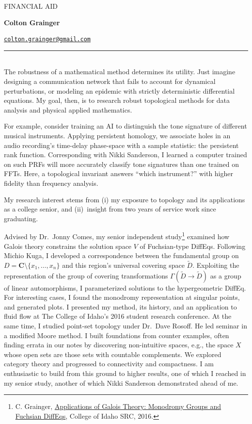 \documentclass{article}
\makeatletter
\newcommand\textbox[1]{\parbox{.33\textwidth}{#1}}
\newcommand\printheader{\noindent
  \textbox{FINANCIAL AID}
  \textbox{\centerline{\large\bf Colton Grainger}}
  \textbox{\raggedleft \href{mailto:colton.grainger@gmail.com}{\texttt{colton.grainger@gmail.com}}\ }

  \vspace{-15pt}
  \noindent
  \rule{\textwidth}{1pt}\\
}
\makeatother
\begin{document}
 

\printheader

The robustness of a mathematical method determines its utility. Just
imagine designing a communication network that fails to account for
dynamical perturbations, or modeling an epidemic with strictly
deterministic differential equations. My goal, then, is to research
robust topological methods for data analysis and physical applied
mathematics.

For example, consider training an AI to distinguish the tone signature
of different musical instruments. Applying persistent homology, we
associate holes in an audio recording's time-delay phase-space with a
sample statistic: the persistent rank function. Corresponding with Nikki
Sanderson, I learned a computer trained on such PRFs will more
accurately classify tone signatures than one trained on FFTs. Here, a
topological invariant answers ``which instrument?'' with higher fidelity
than frequency analysis.

My research interest stems from (i) my exposure to topology and its
applications as a college senior, and (ii)~insight from two years of
service work since graduating.

Advised by Dr.~Jonny Comes, my senior independent study\footnote{C.
  Grainger,
  \href{http://coltongrainger.com/documents/cgrainger_coursework_galois_poster.pdf}{Applications
  of Galois Theory: Monodromy Groups and Fuchsian DiffEqs}, College of Idaho SRC, 2016.}
examined how Galois theory constrains the solution space \(V\) of
Fuchsian-type DiffEqs. Following Michio Kuga, I developed a
correspondence between the fundamental group on
\(D = \mathbf{C}\setminus\{x_1,\ldots,x_n\}\) and this region's
universal covering space \(\tilde{D}\). Exploiting the representation of
the group of covering transformations
\(\Gamma(\tilde{D} \to \tilde{D})\) as a group of linear automorphisms,
I parameterized solutions to the hypergeometric DiffEq. For
interesting cases, I found the monodromy representation at singular
points, and generated plots. I presented my method, its history, and an
application to fluid flow at The College of Idaho's 2016 student
research conference. At the same time, I studied point-set topology
under Dr.~Dave Rosoff. He led seminar in a modified Moore method.
I built foundations from counter examples, often finding errata in our notes by
discovering non-intuitive spaces, e.g., the space \(X\) whose
open sets are those sets with countable complements.
We explored category theory and progressed to connectivity and compactness. I am
enthusiastic to build from this ground to higher results,
one of which I reached in my senior study, another of which Nikki
Sanderson demonstrated ahead of me.
\end{document}
